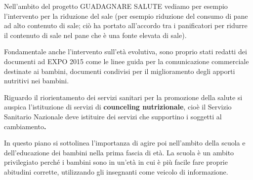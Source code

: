 \documentclass[]{article}
\begin{document}
Nell'ambito del progetto GUADAGNARE SALUTE vediamo per esempio
l'intervento per la riduzione del sale (per esempio riduzione del
consumo di pane ad alto contenuto di sale; ciò ha portato all'accordo
tra i panificatori per ridurre il contenuto di sale nel pane che è una
fonte elevata di sale).

Fondamentale anche l'intervento sull'età evolutiva, sono proprio stati
redatti dei documenti ad EXPO 2015 come le linee guida per la
comunicazione commerciale destinate ai bambini, documenti condivisi per
il miglioramento degli apporti nutritivi nei bambini.

Riguardo il riorientamento dei servizi sanitari per la promozione della
salute si auspica l'istituzione di servizi di \textbf{counceling
nutrizionale}, cioè il Servizio Sanitario Nazionale deve istituire dei
servizi che supportino i soggetti al cambiamento\textbf{.}

In questo piano si sottolinea l'importanza di agire poi nell'ambito
della scuola e dell'educazione dei bambini nella prima fascia di età. La
scuola è un ambito privilegiato perché i bambini sono in un'età in cui è
più facile fare proprie abitudini corrette, utilizzando gli insegnanti
come veicolo di informazione.
\end{document}
